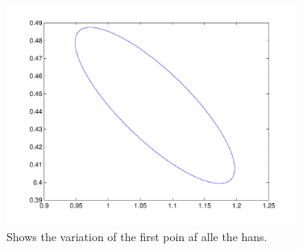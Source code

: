 \begin{figure}[!htbp]
  \centering
  \includegraphics[width=0.85\textwidth]{./images/q31_2}
  \caption{Shows the variation of the first poin af alle the hans.}
  \label{fig:q31allpoints}
\end{figure}

